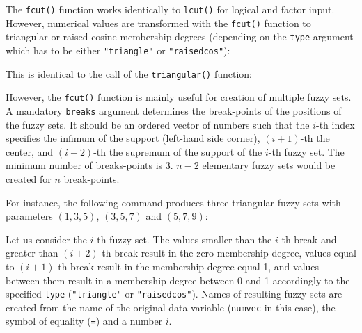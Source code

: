 \documentclass[review]{elsarticle}
\newcommand{\code}[1]{\texttt{#1}}
\begin{document}
The \code{fcut()} function works identically to \code{lcut()} for logical and factor input. However,
numerical values are transformed with the \code{fcut()} function to triangular or raised-cosine membership degrees (depending on the \code{type} argument which has to be either \code{"triangle"} or \code{"raisedcos"}):
%

%
This is identical to the call of the \code{triangular()} function:
%

%

However, the \code{fcut()} function is mainly useful for creation of multiple fuzzy sets. A mandatory \code{breaks} argument determines the break-points of the positions of the fuzzy sets. It should be an ordered vector of numbers such that the $i$-th index specifies the infimum of the support (left-hand side corner), $(i+1)$-th the center, and $(i+2)$-th the supremum of the support of the $i$-th fuzzy set. The minimum number of breaks-points is 3. $n-2$ elementary fuzzy sets would be created for $n$ break-points.

For instance, the following command produces three triangular fuzzy sets with parameters $(1, 3, 5)$, $(3, 5, 7)$ and $(5, 7, 9)$:
%

%

Let us consider the $i$-th fuzzy set. The values smaller than the $i$-th break and greater than $(i+2)$-th break result in the zero membership degree, values equal to $(i+1)$-th break result in the membership degree equal 1, and values between them result in a membership degree between 0 and 1 accordingly to the specified \code{type} (\code{"triangle"} or \code{"raisedcos"}).
Names of resulting fuzzy sets are created from the name of the original data variable (\code{numvec} in this case), the symbol of equality (\code{=}) and a number $i$.
\end{document}
